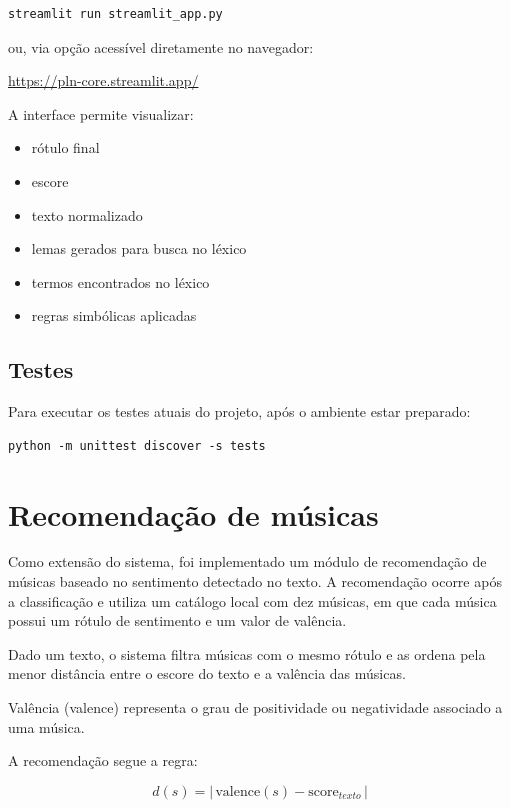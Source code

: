 \documentclass[11pt,a4paper]{article}
\begin{document}
\begin{verbatim}
streamlit run streamlit_app.py
\end{verbatim}

ou, via opção acessível diretamente no navegador:

\url{https://pln-core.streamlit.app/}


A interface permite visualizar:
\begin{itemize}
  \item rótulo final
  \item escore
  \item texto normalizado
  \item lemas gerados para busca no léxico
  \item termos encontrados no léxico
  \item regras simbólicas aplicadas
\end{itemize}

\subsection*{Testes}

Para executar os testes atuais do projeto, após o ambiente estar preparado:

\begin{verbatim}
python -m unittest discover -s tests
\end{verbatim}

\section{Recomendação de músicas}

Como extensão do sistema, foi implementado um módulo de recomendação de músicas baseado no sentimento detectado no texto. A recomendação ocorre após a classificação e utiliza um catálogo local com dez músicas, em que cada música possui um rótulo de sentimento e um valor de valência.

Dado um texto, o sistema filtra músicas com o mesmo rótulo e as ordena pela menor distância entre o escore do texto e a valência das músicas.

Valência (valence) representa o grau de positividade ou negatividade associado a uma música.

A recomendação segue a regra:

\begin{equation}
d(s) = |\,\text{valence}(s) - \text{score}_{texto}\,|
\end{equation}
\end{document}
